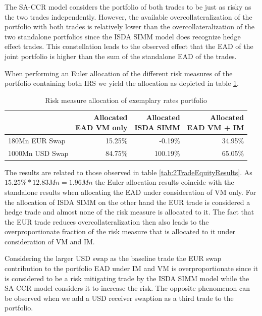 \documentclass[../Thesis_AHoecherl.tex]{subfiles}
\begin{document}
    The \gls{SA-CCR} model considers the portfolio of both trades to be just as risky as the two trades independently. However, the available overcollateralization of the portfolio with both trades is relatively lower than the overcollateralization of the two standalone portfolios since the \gls{ISDA SIMM} model does recognize hedge effect trades. This constellation leads to the observed effect that the \gls{EAD} of the joint portfolio is higher than the sum of the standalone \gls{EAD} of the trades.

    When performing an Euler allocation of the different risk measures of the portfolio containing both \gls{IRS} we yield the allocation as depicted in table \ref{tab:2TradeRatesAllocation}.

    \begin{table}[htbp]
        \centering
        \begin{tabular}{l||r|r|r}
                & \makecell{Allocated \\ \gls{EAD} \gls{VM} only} & \makecell{Allocated \\ \gls{ISDA SIMM}} & \makecell{Allocated \\ \gls{EAD} \gls{VM} + IM} \\
                \toprule
        180Mn EUR Swap & 15.25\% & -0.19\% & 34.95\% \\
        1000Mn USD Swap & 84.75\% & 100.19\% & 65.05\% \\
        \end{tabular}%
        \caption{Risk measure allocation of exemplary rates portfolio}
        \label{tab:2TradeRatesAllocation}%
    \end{table}%
    
    The results are related to those observed in table \ref{tab:2TradeEquityResults}. As $15.25\% * 12.83Mn = 1.96Mn$ the Euler allocation results coincide with the standalone results when allocating the \gls{EAD} under consideration of \gls{VM} only. 
    For the allocation of \gls{ISDA SIMM} on the other hand the EUR trade is considered a hedge trade and almost none of the risk measure is allocated to it. 
    The fact that the EUR trade reduces overcollateralization then also leads to the overproportionate fraction of the risk measure that is allocated to it under consideration of \gls{VM} and IM.
    
    Considering the larger USD swap as the baseline trade the EUR swap contribution to the portfolio \gls{EAD} under \gls{IM} and \gls{VM} is overproportionate since it is considered to be a risk mitigating trade by the \gls{ISDA SIMM} model while the \gls{SA-CCR} model considers it to increase the risk. The opposite phenomenon can be observed when we add a USD receiver swaption as a third trade to the portfolio.
\end{document}
